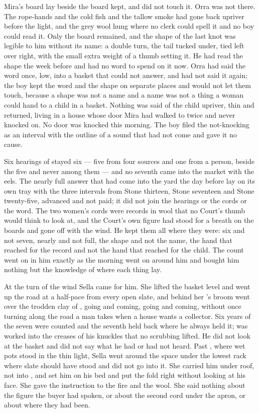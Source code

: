 Mira's board lay beside the board  kept, and did not touch it. Orra was not there. The rope-hands and the cold fish and the tallow smoke had gone back upriver before the light, and the grey wool  hung where no clerk could spell it and no boy could read it. Only the board remained, and the shape of the last knot was legible to him without its name: a double turn, the tail tucked under, tied left over right, with the small extra weight of a thumb setting it. He had read the shape the week before and had no word to spend on it now. Orra had said the word once, low, into a basket that could not answer, and had not said it again; the boy kept the word and the shape on separate places and would not let them touch, because a shape was not a name and a name was not a thing a woman could hand to a child in a basket. Nothing was said of the child upriver, thin and returned, living in a house whose door Mira had walked to twice and never knocked on. No door was knocked this morning. The boy filed the not-knocking as an interval with the outline of a sound that had not come and gave it no cause.

Six hearings of  stayed six --- five from four sources and one from a person, beside the five and never among them --- and no seventh came into the market with the eels. The nearly full answer that had come into the yard the day before lay on its own tray with the three intervals from Stone thirteen, Stone seventeen and Stone twenty-five, advanced and not paid; it did not join the hearings or the cords or the word. The two women's cords were records in wool that no Court's thumb would think to look at, and the Court's own figure had stood for a breath on the boards and gone off with the wind. He kept them all where they were: six and not seven, nearly and not full, the shape and not the name, the hand that reached for the record and not the hand that reached for the child. The count went on in him exactly as the morning went on around him and bought him nothing but the knowledge of where each thing lay.

\scenebreak

At the turn of the wind Sella came for him. She lifted the basket level and went up the road at a half-pace from every open slate, and behind her 's broom went over the trodden clay of , going and coming, going and coming, without once turning along the road a man takes when a house wants a collector. Six years of the seven were counted and the seventh held back where he always held it;  was worked into the creases of his knuckles that no scrubbing lifted. He did not look at the basket and did not say what he had or had not heard. Past , where wet pots stood in the thin light, Sella went around the space under the lowest rack where slate should have stood and did not go into it. She carried him under  roof, not into , and set him on his bed and put the fold right without looking at his face. She gave the instruction to the fire and the wool. She said nothing about the figure the buyer had spoken, or about the second cord under the apron, or about where they had been.

